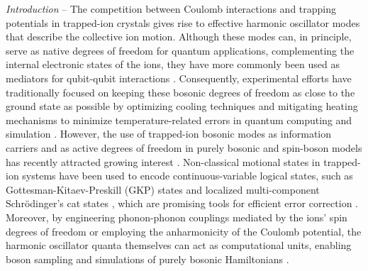 \documentclass[
reprint,
superscriptaddress,

amsmath,amssymb,
aps,
prl,

floatfix,
]{revtex4-2}
\begin{document}
\maketitle

\emph{Introduction} -- The competition between Coulomb interactions and trapping potentials in trapped-ion crystals gives rise to effective harmonic oscillator modes that describe the collective ion motion. Although these modes can, in principle, serve as native degrees of freedom for quantum applications, complementing the internal electronic states of the ions, they have more commonly been used as mediators for qubit-qubit interactions \cite{monroe2021programmable}. Consequently, experimental efforts have traditionally focused on keeping these bosonic degrees of freedom as close to the ground state as possible by optimizing cooling techniques and mitigating heating mechanisms to minimize temperature-related errors in quantum computing and simulation \cite{wineland1997issue,myatt2000decoherence,brownnutt2015noise}. However, the use of trapped-ion bosonic modes as information carriers and as active degrees of freedom in purely bosonic and spin-boson models has recently attracted growing interest \cite{chen2021bosonic,pagano2025varenna}. Non-classical motional states in trapped-ion systems have been used to encode continuous-variable logical states, such as Gottesman-Kitaev-Preskill (GKP) states \cite{fluhmann2019encoding,matsos2024gkp} and localized multi-component Schrödinger’s cat states \cite{rojkov2024stabilizationcatstatemanifoldsusing}, which are promising tools for efficient error correction \cite{gkp2001original,michael2016ecc,grimsmo2020bosoniccode}. Moreover, by engineering phonon-phonon couplings mediated by the ions’ spin degrees of freedom or employing the anharmonicity of the Coulomb potential, the harmonic oscillator quanta themselves can act as computational units, enabling boson sampling and simulations of purely bosonic Hamiltonians \cite{toyoda2015hom,debnath2018boson,zhang2018NOON,ding2018trilinear,katz2023boson,hou2024modulate}.
\end{document}

